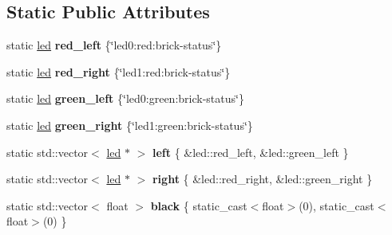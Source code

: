 \subsection*{Static Public Attributes}
\begin{DoxyCompactItemize}
\item 
\mbox{\label{classev3dev_1_1led_a605c61a57d685e06bc27257e26aba80b}} 
static \hyperlink{classev3dev_1_1led}{led} {\bfseries red\+\_\+left} \{\char`\"{}led0\+:red\+:brick-\/status\char`\"{}\}
\item 
\mbox{\label{classev3dev_1_1led_af9cb415c0dc1fb0af911eeabc535c8c6}} 
static \hyperlink{classev3dev_1_1led}{led} {\bfseries red\+\_\+right} \{\char`\"{}led1\+:red\+:brick-\/status\char`\"{}\}
\item 
\mbox{\label{classev3dev_1_1led_a4f1693df3ddb6db4100234200322c9a4}} 
static \hyperlink{classev3dev_1_1led}{led} {\bfseries green\+\_\+left} \{\char`\"{}led0\+:green\+:brick-\/status\char`\"{}\}
\item 
\mbox{\label{classev3dev_1_1led_aad7e3d0722d03184f73d0205a0df5ae6}} 
static \hyperlink{classev3dev_1_1led}{led} {\bfseries green\+\_\+right} \{\char`\"{}led1\+:green\+:brick-\/status\char`\"{}\}
\item 
\mbox{\label{classev3dev_1_1led_a4a0fd14cb6453cea848059877d902dfc}} 
static std\+::vector$<$ \hyperlink{classev3dev_1_1led}{led} $\ast$ $>$ {\bfseries left} \{ \&led\+::red\+\_\+left, \&led\+::green\+\_\+left \}
\item 
\mbox{\label{classev3dev_1_1led_a027d95aa325ddb1156c074b4d3998435}} 
static std\+::vector$<$ \hyperlink{classev3dev_1_1led}{led} $\ast$ $>$ {\bfseries right} \{ \&led\+::red\+\_\+right, \&led\+::green\+\_\+right \}
\item 
\mbox{\label{classev3dev_1_1led_aa03ff6ce1feec6cc236912ac8d0d30bf}} 
static std\+::vector$<$ float $>$ {\bfseries black} \{ static\+\_\+cast$<$float$>$(0), static\+\_\+cast$<$float$>$(0) \}
\item 
\mbox{\label{classev3dev_1_1led_a826be383afabdad809b3df3010483278}} 

\end{DoxyCompactItemize}
